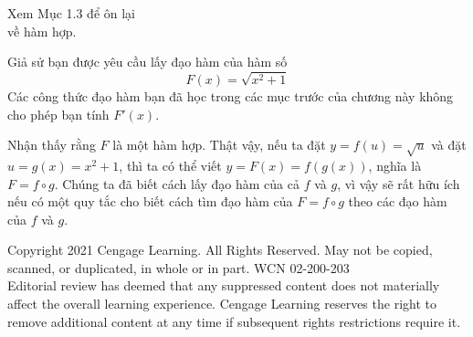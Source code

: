 \vspace{10pt}

\noindent
\begin{minipage}[t]{0.23\textwidth}
  \vspace{0pt}
  \vspace{62pt} %
  {\fontsize{8.5pt}{11pt}\selectfont\noindent\textsf{Xem Mục 1.3 để ôn lại\\về hàm hợp.}}
\end{minipage}%
\hspace{0.04\textwidth}%
\begin{minipage}[t]{0.73\textwidth}
  \vspace{0pt}
  Giả sử bạn được yêu cầu lấy đạo hàm của hàm số
  \[
  F(x) = \sqrt{x^2 + 1}
  \]
  Các công thức đạo hàm bạn đã học trong các mục trước của chương này không cho phép bạn tính $F'(x)$.

  \vspace{6pt}
  Nhận thấy rằng $F$ là một hàm hợp. Thật vậy, nếu ta đặt $y = f(u) = \sqrt{u}$ và đặt $u = g(x) = x^2 + 1$, thì ta có thể viết $y = F(x) = f(g(x))$, nghĩa là $F = f \circ g$. Chúng ta đã biết cách lấy đạo hàm của cả $f$ và $g$, vì vậy sẽ rất hữu ích nếu có một quy tắc cho biết cách tìm đạo hàm của $F = f \circ g$ theo các đạo hàm của $f$ và $g$.
\end{minipage}

\vfill
\begin{center}
{\fontsize{6.5pt}{8pt}\selectfont\color{stewartgray}
Copyright 2021 Cengage Learning. All Rights Reserved. May not be copied, scanned, or duplicated, in whole or in part. WCN 02-200-203\\
Editorial review has deemed that any suppressed content does not materially affect the overall learning experience. Cengage Learning reserves the right to remove additional content at any time if subsequent rights restrictions require it.
}
\end{center}
